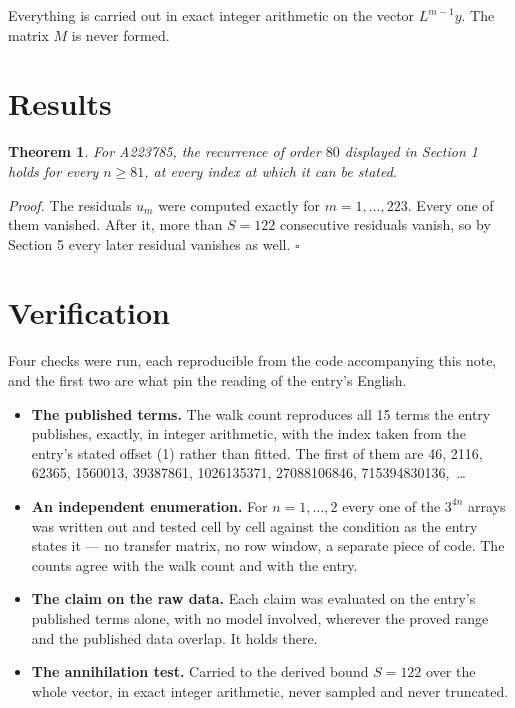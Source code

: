 \documentclass[11pt]{article}
\newtheorem{theorem}{Theorem}
\theoremstyle{definition}
\begin{document}
Everything is carried out in exact integer arithmetic on the vector $L^{m-1}y$. The matrix $M$ is never formed.

\section{Results}

\begin{theorem} For A223785, the recurrence of order $80$ displayed in Section 1 holds for every $n \ge 81$, at every index at which it can be stated.\end{theorem}

{\itshape Proof.} The residuals $u_m$ were computed exactly for $m = 1,\dots,223$. Every one of them vanished. After it, more than $S = 122$ consecutive residuals vanish, so by Section 5 every later residual vanishes as well. $\square$

\section{Verification}

Four checks were run, each reproducible from the code accompanying this note, and the first two are what pin the reading of the entry's English.

\begin{itemize}

\item {\bfseries The published terms.} The walk count reproduces all 15 terms the entry publishes, exactly, in integer arithmetic, with the index taken from the entry's stated offset (1) rather than fitted. The first of them are 46, 2116, 62365, 1560013, 39387861, 1026135371, 27088106846, 715394830136,~\dots

\item {\bfseries An independent enumeration.} For $n = 1,\dots,2$ every one of the $3^{4n}$ arrays was written out and tested cell by cell against the condition as the entry states it --- no transfer matrix, no row window, a separate piece of code. The counts agree with the walk count and with the entry.

\item {\bfseries The claim on the raw data.} Each claim was evaluated on the entry's published terms alone, with no model involved, wherever the proved range and the published data overlap. It holds there.

\item {\bfseries The annihilation test.} Carried to the derived bound $S = 122$ over the whole vector, in exact integer arithmetic, never sampled and never truncated.

\end{itemize}
\end{document}
